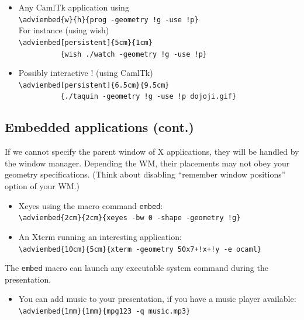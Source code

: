 \documentclass[12pt]{article}
\begin{document}
\begin{itemize}
  \item Any CamlTk application using\\
   \verb+\adviembed{w}{h}{prog -geometry !g -use !p}+\\
   For instance (using wish)\\
   \verb|\adviembed[persistent]{5cm}{1cm}|\\
   \verb|          {wish ./watch -geometry !g -use !p}|\\
\adviwait
  \item Possibly interactive ! (using CamlTk)\\
   \verb|\adviembed[persistent]{6.5cm}{9.5cm}|\\
   \verb|          {./taquin -geometry !g -use !p dojoji.gif}|\\

\end{itemize}

\newpage

\subsection* {Embedded applications (cont.)}

If we cannot specify the parent window of X applications,
they will be handled by the window manager.
Depending the WM, 
their placements may not obey your geometry specifications.
(Think about disabling ``remember window positions'' option of your WM.)

\begin{itemize}
 \item Xeyes using the macro command \verb|embed|:\\
   \verb|\adviembed{2cm}{2cm}{xeyes -bw 0 -shape -geometry !g}|\\

 \item An Xterm running an interesting application:\\
   \verb|\adviembed{10cm}{5cm}{xterm -geometry 50x7+!x+!y -e ocaml}|\\
\end{itemize}

The \verb|embed| macro can launch any executable system command during
the presentation. 
\begin{itemize}
 \item You can add music to your presentation, if you have a music
  player available:\\
  \verb|\adviembed{1mm}{1mm}{mpg123 -q music.mp3}|
\end{itemize}
\end{document}
